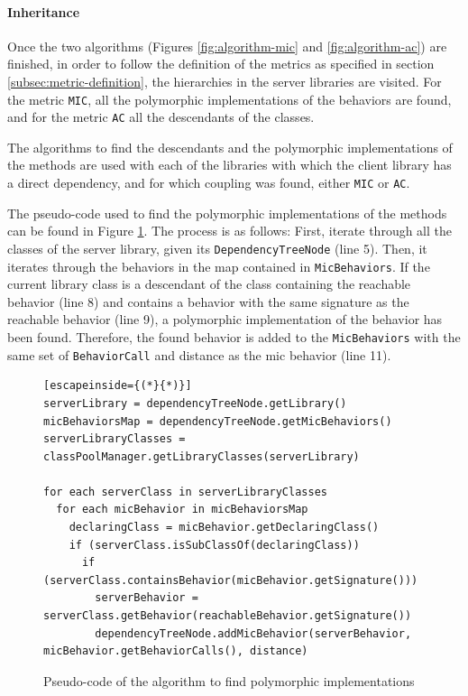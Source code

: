 \paragraph{Inheritance}\label{paragraph:inheritance}
Once the two algorithms (Figures \ref{fig:algorithm-mic} and \ref{fig:algorithm-ac}) are finished, in order to follow the definition of the metrics as specified in section \ref{subsec:metric-definition}, the hierarchies in the server libraries are visited. For the metric \texttt{MIC}, all the polymorphic implementations of the behaviors are found, and for the metric \texttt{AC} all the descendants of the classes.

The algorithms to find the descendants and the polymorphic implementations of the methods are used with each of the libraries with which the client library has a direct dependency, and for which coupling was found, either \texttt{MIC} or \texttt{AC}.

The pseudo-code used to find the polymorphic implementations of the methods can be found in Figure \ref{fig:algorithm-polymorphy}. The process is as follows: First, iterate through all the classes of the server library, given its \texttt{DependencyTreeNode} (line 5). Then, it iterates through the behaviors in the map contained in \texttt{MicBehaviors}. If the current library class is a descendant of the class containing the reachable behavior (line 8) and contains a behavior with the same signature as the reachable behavior (line 9), a polymorphic implementation of the behavior has been found. Therefore, the found behavior is added to the \texttt{MicBehaviors} with the same set of \texttt{BehaviorCall} and distance as the mic behavior (line 11).

\begin{figure}[ht!]
\begin{lstlisting}[escapeinside={(*}{*)}]
serverLibrary = dependencyTreeNode.getLibrary()
micBehaviorsMap = dependencyTreeNode.getMicBehaviors()
serverLibraryClasses = classPoolManager.getLibraryClasses(serverLibrary)

for each serverClass in serverLibraryClasses
  for each micBehavior in micBehaviorsMap
    declaringClass = micBehavior.getDeclaringClass()
    if (serverClass.isSubClassOf(declaringClass))
      if (serverClass.containsBehavior(micBehavior.getSignature()))
        serverBehavior = serverClass.getBehavior(reachableBehavior.getSignature())
        dependencyTreeNode.addMicBehavior(serverBehavior, micBehavior.getBehaviorCalls(), distance)
\end{lstlisting}
\caption{Pseudo-code of the algorithm to find polymorphic implementations}
\label{fig:algorithm-polymorphy}
\end{figure}

